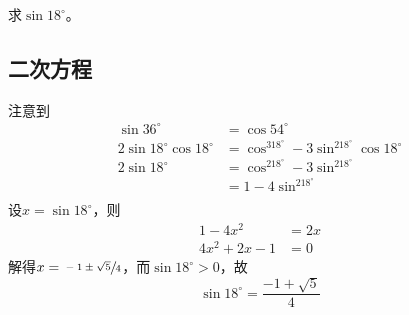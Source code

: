 

求$\sin18^\circ$。


\subsection{二次方程}

注意到
\begin{align*}
  \sin36^\circ &= \cos54^\circ \\
  2\sin18^\circ\cos18^\circ &= \cos^318^\circ - 3\sin^218^\circ\cos18^\circ \\
  2\sin18^\circ &= \cos^218^\circ - 3\sin^218^\circ \\
  &= 1 - 4\sin^218^\circ \\
\end{align*}
设$x = \sin18^\circ$，则
\begin{align*}
  1 - 4x^2 &= 2x \\
  4x^2 + 2x - 1 &= 0
\end{align*}
解得$x = \sfrac{-1 \pm\sqrt5}4$，而$\sin18^\circ > 0$，故
\[ \sin18^\circ = \frac{-1 + \sqrt5}4 \]
